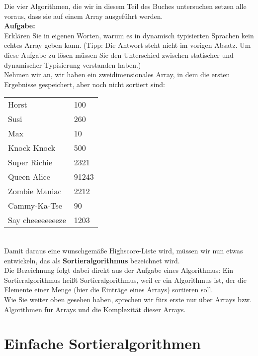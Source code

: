 Die vier Algorithmen, die wir in diesem Teil des Buches untersuchen setzen alle voraus, dass sie auf einem Array ausgeführt werden.\\

\textbf{Aufgabe:}\\

Erklären Sie in eigenen Worten, warum es in dynamisch typisierten Sprachen kein \glqq{}echtes\grqq{} Array geben kann. (Tipp: Die Antwort steht nicht im vorigen Absatz. Um diese Aufgabe zu lösen müssen Sie den Unterschied zwischen statischer und dynamischer Typisierung verstanden haben.)\\

Nehmen wir an, wir haben ein zweidimensionales Array, in dem die ersten Ergebnisse gespeichert, aber noch nicht sortiert sind:\\

\begin{tabular}{l l}
	Horst & 100 \\
	Susi & 260 \\
	Max & 10 \\
	Knock Knock & 500 \\
	Super Richie & 2321\\
	Queen Alice & 91243 \\
	Zombie Maniac & 2212 \\
	Cammy-Ka-Tse & 90 \\
	Say cheeeeeeeeze & 1203 \\
\end{tabular}\\

Damit daraus eine wunschgemäße Highscore-Liste wird, müssen wir nun etwas entwickeln, das als \textbf{Sortieralgorithmus} bezeichnet wird.\\

Die Bezeichnung folgt dabei direkt aus der Aufgabe eines Algorithmus: Ein Sortieralgorithmus heißt Sortieralgorithmus, weil er ein Algorithmus ist, der die Elemente einer Menge (hier die Einträge eines Arrays) sortieren soll.\\

Wie Sie weiter oben gesehen haben, sprechen wir fürs erste nur über Arrays bzw. Algorithmen für Arrays und die Komplexität dieser Arrays.

\chapter{Einfache Sortieralgorithmen}

